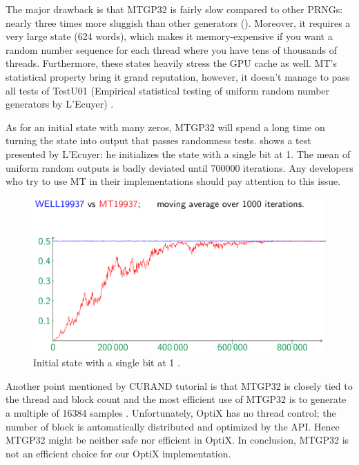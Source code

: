The major drawback is that MTGP32 is fairly slow compared to other PRNGs: nearly three times more sluggish than other generators (). Moreover, it requires a very large state (624 words), which makes it memory-expensive if you want a random number sequence for each thread where you have tens of thousands of threads. Furthermore, these states heavily stress the GPU cache as well. MT's statistical property bring it grand reputation, however, it doesn't manage to pass all tests of TestU01 (Empirical statistical testing of uniform random number generators by L'Ecuyer) \citep{lecuyer}. 

As for an initial state with many zeros, MTGP32 will spend a long time on turning the state into output that passes randomness tests.  shows a test presented by L'Ecuyer: he initializes the state with a single bit at 1. The mean of uniform random outputs is badly deviated until 700000 iterations. Any developers who try to use MT in their implementations should pay attention to this issue.
\begin{figure}[htbp]
	\centering
		\includegraphics[width=13cm]{Figures/manyzeros.png}
	\caption[Initial state with a single bit at 1]{Initial state with a single bit at 1 \citep{lecuyer}.}
	\label{fig:manyzeros}
\end{figure}

Another point mentioned by CURAND tutorial is that MTGP32 is closely tied to the thread and block count and the most efficient use of MTGP32 is to generate a multiple of 16384 samples \citep{curand}. Unfortunately, OptiX has no thread control; the number of block is automatically distributed and optimized by the API. Hence MTGP32 might be neither safe nor efficient in OptiX. In conclusion, MTGP32 is not an efficient choice for our OptiX implementation.

